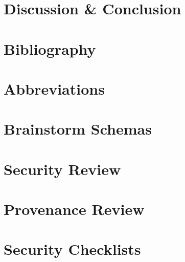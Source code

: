 \documentclass[a4paper]{report}
\begin{document}
	\chapter{Discussion \& Conclusion}
	\label{discussion}
	
	
	
	
	
	
	
	\clearpage
	
	\chapter{Bibliography}
	\printbibliography[heading=none]
	
	\appendix
	\chapter{Abbreviations}
	\label{abbreviations}
	
	
	
	\chapter{Brainstorm Schemas}
	\label{brainstorm-before-after}
	
	
	
	\chapter{Security Review}
	\label{security-review-appendix}
	
	
	
	
	
	\chapter{Provenance Review}
	\label{provenance-review-appendix}
	
	
	
	\chapter{Security Checklists}
	\label{security-appendix}
	
\end{document}
